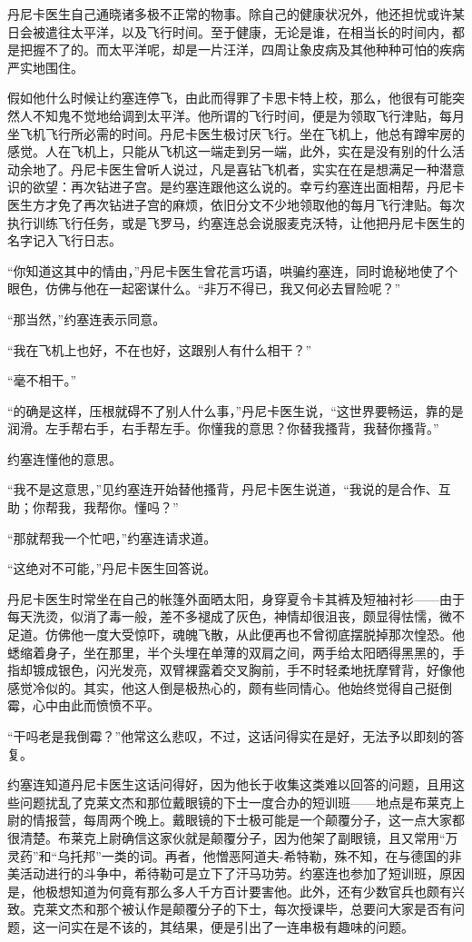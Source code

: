     丹尼卡医生自己通晓诸多极不正常的物事。除自己的健康状况外，他还担忧或许某日会被遣往太平洋，以及飞行时间。至于健康，无论是谁，在相当长的时间内，都是把握不了的。而太平洋呢，却是一片汪洋，四周让象皮病及其他种种可怕的疾病严实地围住。

    假如他什么时候让约塞连停飞，由此而得罪了卡思卡特上校，那么，他很有可能突然人不知鬼不觉地给调到太平洋。他所谓的飞行时间，便是为领取飞行津贴，每月坐飞机飞行所必需的时间。丹尼卡医生极讨厌飞行。坐在飞机上，他总有蹲牢房的感觉。人在飞机上，只能从飞机这一端走到另一端，此外，实在是没有别的什么活动余地了。丹尼卡医生曾听人说过，凡是喜钻飞机者，实实在在是想满足一种潜意识的欲望：再次钻进子宫。是约塞连跟他这么说的。幸亏约塞连出面相帮，丹尼卡医生方才免了再次钻进子宫的麻烦，依旧分文不少地领取他的每月飞行津贴。每次执行训练飞行任务，或是飞罗马，约塞连总会说服麦克沃特，让他把丹尼卡医生的名字记入飞行日志。

 


    “你知道这其中的情由，”丹尼卡医生曾花言巧语，哄骗约塞连，同时诡秘地使了个眼色，仿佛与他在一起密谋什么。“非万不得已，我又何必去冒险呢？”

    “那当然，”约塞连表示同意。

    “我在飞机上也好，不在也好，这跟别人有什么相干？”

    “毫不相干。”

    “的确是这样，压根就碍不了别人什么事，”丹尼卡医生说，“这世界要畅运，靠的是润滑。左手帮右手，右手帮左手。你懂我的意思？你替我搔背，我替你搔背。”

    约塞连懂他的意思。

    “我不是这意思，”见约塞连开始替他搔背，丹尼卡医生说道，“我说的是合作、互助；你帮我，我帮你。懂吗？”

    “那就帮我一个忙吧，”约塞连请求道。

    “这绝对不可能，”丹尼卡医生回答说。

    丹尼卡医生时常坐在自己的帐篷外面晒太阳，身穿夏令卡其裤及短袖衬衫——由于每天洗烫，似消了毒一般，差不多褪成了灰色，神情却很沮丧，颇显得怯懦，微不足道。仿佛他一度大受惊吓，魂魄飞散，从此便再也不曾彻底摆脱掉那次惶恐。他蟋缩着身子，坐在那里，半个头埋在单薄的双肩之间，两手给太阳晒得黑黑的，手指却镀成银色，闪光发亮，双臂裸露着交叉胸前，手不时轻柔地抚摩臂背，好像他感觉冷似的。其实，他这人倒是极热心的，颇有些同情心。他始终觉得自己挺倒霉，心中由此而愤愤不平。

    “干吗老是我倒霉？”他常这么悲叹，不过，这话问得实在是好，无法予以即刻的答复。

    约塞连知道丹尼卡医生这话问得好，因为他长于收集这类难以回答的问题，且用这些问题扰乱了克莱文杰和那位戴眼镜的下士一度合办的短训班——地点是布莱克上尉的情报营，每周两个晚上。戴眼镜的下士极可能是一个颠覆分子，这一点大家都很清楚。布莱克上尉确信这家伙就是颠覆分子，因为他架了副眼镜，且又常用“万灵药”和“乌托邦”一类的词。再者，他憎恶阿道夫-希特勒，殊不知，在与德国的非美活动进行的斗争中，希待勒可是立下了汗马功劳。约塞连也参加了短训班，原因是，他极想知道为何竟有那么多人千方百计要害他。此外，还有少数官兵也颇有兴致。克莱文杰和那个被认作是颠覆分子的下士，每次授课毕，总要问大家是否有问题，这一问实在是不该的，其结果，便是引出了一连串极有趣味的问题。

